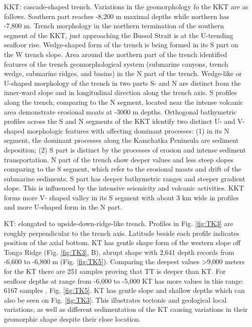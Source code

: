 \documentclass[11pt,a4paper]{report}
\begin{document}
{\ac{KKT}: cascade-shaped trench. Variations in the geomorphology  fo the \ac{KKT} are as follows. Southern part reaches -8,200 m maximal depths while northern has -7,800 m. Trench morphology in the northern termination of the southern segment of the \ac{KKT}, just approaching the Bussol Strait is at the U-trending seafloor rise. Wedge-shaped form of the trench is being formed in its S part on the W trench slope. Area around the northern part of the trench identified features of the trench geomorphological system (submarine canyons, trench wedge, submarine ridges, and basins) in the N part of the trench. Wedge-like or U-shaped morphology of the trench in two parts S- and N are distinct from the inner-ward slope and in longitudinal direction along the trench axis. S profiles along the trench, comparing to the N segment, located near the intense volcanic area demonstrate erosional moats at -3000 m depths. Orthogonal bathymetric profiles across the S and N segments of the \ac{KKT} identify two distinct U- and V-shaped morphologic features with affecting dominant processes: (1) in its N segment, the dominant processes along the Kamchatka Peninsula are sediment deposition; (2) S part is distinct by the processes of erosion and intense sediment transportation. N part of the trench show deeper values and less steep slopes comparing to the S segment, which refer to the erosional moats and drift of the submarine sediments. S part has deeper bathymetric ranges and steeper gradient slope. This is influenced by the intensive seismicity and volcanic activities. \ac{KKT} forms more V- shaped valley in its S segment with about 3 km wide in profiles and more U-shaped form in the N part. 

\ac{KT}: elongated to upside-down-ridge-like trench. Profiles in Fig. \ref{fig:TK3} are roughly perpendicular to the trench axis. Latitude beside each profile indicates position of the axial bottom. \ac{KT} has gentle shape form of the western slope off Tonga Ridge (Fig. \ref{fig:TK3}, B), abrupt shape with 2,641 depth records from -6,600 to -6,800 m (Fig. \ref{fig:TK5}). Comparing the deepest values >9,000 meters for the \ac{KT} there are  251 samples proving that \ac{TT} is deeper than \ac{KT}. For seafloor depths at range from -6,000 to -5,000 \ac{KT} has more values in this range: 6167 samples \cite{Lemenkova201994}, Fig. \ref{fig:TK5}. \ac{KT} has gentle slope and shallow depths which can also be seen on Fig. \ref{fig:TK3}. This illustrates tectonic and geological local variations, as well as different sedimentation of the \ac{KT} causing variations in their geomorphic shape despite their close location.

}
\end{document}
